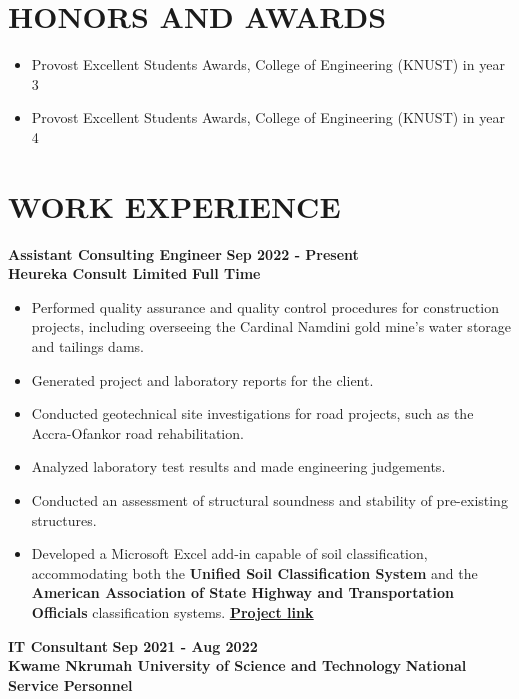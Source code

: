 \documentclass[letterpaper, 12pt]{article}
\newcommand{\cvsection}[1]{
	
	\section*{#1}
}
\newcommand{\verticalSpace}{4pt}
\begin{document}
	
	\cvsection{HONORS AND AWARDS}
	
	\begin{itemize}[leftmargin=*]
		
		\item Provost Excellent Students Awards, College of Engineering (KNUST) in year 3
		\item Provost Excellent Students Awards, College of Engineering (KNUST) in year 4
		
	\end{itemize}
	
	
	\cvsection{WORK EXPERIENCE}
	
	\textbf{Assistant Consulting Engineer} \hfill \textbf{Sep 2022 - Present} \\ [\verticalSpace]
	\textbf{Heureka Consult Limited} \hfill \textbf{Full Time}
	
	\begin{itemize}[leftmargin=*]
		
		\item Performed quality assurance and quality control procedures for construction projects, including overseeing the Cardinal Namdini gold mine's water storage and tailings dams.
		\item Generated project and laboratory reports for the client.
		\item Conducted geotechnical site investigations for road projects, such as the Accra-Ofankor road rehabilitation.		
		\item Analyzed laboratory test results and made engineering judgements.
		\item Conducted an assessment of structural soundness and stability of pre-existing structures.
		\item Developed a Microsoft Excel add-in capable of soil classification, accommodating both the \textbf{Unified Soil Classification System} and the \textbf{American Association of State Highway and Transportation Officials} classification systems.	\href{https://github.com/patrickboateng/geolab-excel-addin}{\underline{\textbf{Project link}}} \\
		
	\end{itemize}
	
	\textbf{IT Consultant} \hfill \textbf{Sep 2021 - Aug 2022} \\ [\verticalSpace]
	\textbf{Kwame Nkrumah University of Science and Technology} \hfill \textbf{National Service Personnel}
	
\end{document}
